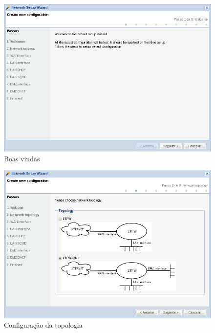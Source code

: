 \begin{figure}[H]
    \begin{center}
    \includegraphics[scale=0.38]{screenshots/etfw/etfw_wizard_01.png}
    \caption{Boas vindas}
    \label{fig:etfw_wizard_passo1}
    \end{center}
\end{figure}

\begin{figure}[H]
    \begin{center}
    \includegraphics[scale=0.38]{screenshots/etfw/etfw_wizard_02.png}
    \caption{Configuração da topologia}
    \label{fig:etfw_wizard_passo2}
    \end{center}
\end{figure}

